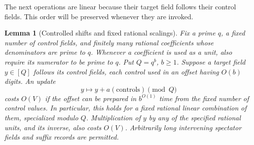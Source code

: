 \documentclass[11pt]{article}
\newtheorem{lemma}[theorem]{Lemma}
\theoremstyle{definition}
\begin{document}
The next operations are linear because their target field follows their
control fields.  This order will be preserved whenever they are invoked.

\begin{lemma}[Controlled shifts and fixed rational scalings]
\label{lem:ordered-affine-streams}
Fix a prime $q$, a fixed number of control fields, and finitely many
rational coefficients whose denominators are prime to $q$.  Whenever a
coefficient is used as a unit, also require its numerator to be prime to
$q$.  Put $Q=q^b$, $b\ge1$.
Suppose a target field $y\in[Q]$ follows its control fields, each control
used in an offset having $O(b)$ digits.  An update
\[
 y\longmapsto y+a(\text{controls})\pmod Q
\]
costs $O(V)$ if the offset can be prepared in $b^{O(1)}$ time from the
fixed number of control values.  In particular, this holds for a fixed
rational linear combination of them, specialized modulo $Q$.
Multiplication of $y$ by any of the specified rational units, and its
inverse, also costs $O(V)$.  Arbitrarily long intervening spectator
fields and suffix records are permitted.
\end{lemma}
\end{document}
